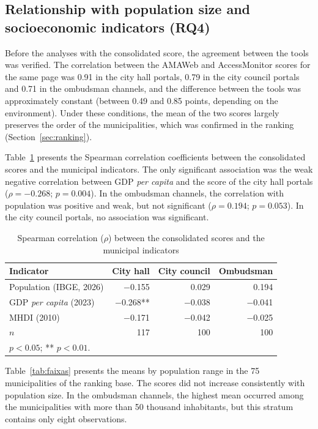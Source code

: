 \documentclass[12pt]{article}
\begin{document}
\subsection{Relationship with population size and socioeconomic indicators (RQ4)}

Before the analyses with the consolidated score, the agreement between the tools was verified. The correlation between the AMAWeb and AccessMonitor scores for the same page was 0.91 in the city hall portals, 0.79 in the city council portals and 0.71 in the ombudsman channels, and the difference between the tools was approximately constant (between 0.49 and 0.85 points, depending on the environment). Under these conditions, the mean of the two scores largely preserves the order of the municipalities, which was confirmed in the ranking (Section~\ref{sec:ranking}).

Table~\ref{tab:correlacao} presents the Spearman correlation coefficients between the consolidated scores and the municipal indicators. The only significant association was the weak negative correlation between GDP \textit{per capita} and the score of the city hall portals ($\rho = -0.268$; $p = 0.004$). In the ombudsman channels, the correlation with population was positive and weak, but not significant ($\rho = 0.194$; $p = 0.053$). In the city council portals, no association was significant.

\begin{table}[ht]
\centering
\caption{Spearman correlation ($\rho$) between the consolidated scores and the municipal indicators}
\label{tab:correlacao}
\small
\begin{tabular}{lrrr}
\toprule
\textbf{Indicator} & \textbf{City hall} & \textbf{City council} & \textbf{Ombudsman} \\
\midrule
Population (IBGE, 2026)        & $-$0.155   &    0.029 &    0.194 \\
GDP \textit{per capita} (2023) & $-$0.268** & $-$0.038 & $-$0.041 \\
MHDI (2010)                    & $-$0.171   & $-$0.042 & $-$0.025 \\
\midrule
$n$                            & 117 & 100 & 100 \\
\bottomrule
\multicolumn{4}{l}{\footnotesize * $p < 0.05$; ** $p < 0.01$.}
\end{tabular}
\end{table}

Table~\ref{tab:faixas} presents the means by population range in the 75 municipalities of the ranking base. The scores did not increase consistently with population size. In the ombudsman channels, the highest mean occurred among the municipalities with more than 50 thousand inhabitants, but this stratum contains only eight observations.
\end{document}
